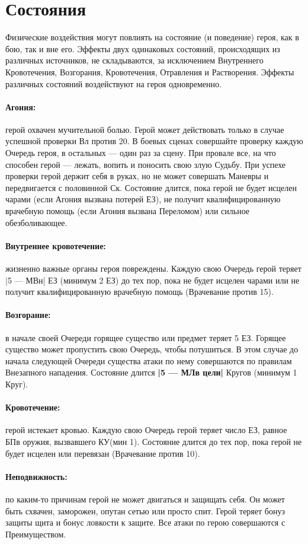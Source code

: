 \section{Состояния}
Физические  воздействия могут повлиять на состояние (и поведение) героя, как в бою, так и вне его. Эффекты двух
одинаковых состояний, происходящих из различных источников, не складываются, за исключением Внутреннего Кровотечения, Возгорания, Кровотечения, Отравления и Растворения. Эффекты различных состояний воздействуют на героя одновременно.
\paragraph{Агония:} герой охвачен мучительной болью. Герой может действовать только в случае успешной проверки Вл против 20. В боевых сценах совершайте проверку каждую Очередь героя, в остальных — один раз за сцену. При провале все, на что способен герой — лежать, вопить и поносить свою злую Судьбу. При успехе проверки герой держит себя в руках, но не может совершать Маневры и передвигается с половинной Ск. Состояние длится, пока герой не будет исцелен чарами (если Агония вызвана потерей ЕЗ), не получит квалифицированную врачебную помощь (если Агония вызвана Переломом) или сильное обезболивающее.
\paragraph{Внутреннее кровотечение:} жизненно важные органы героя повреждены. Каждую свою Очередь герой теряет |5 — МВн| ЕЗ (минимум 2 ЕЗ) до тех пор, пока не будет исцелен чарами или не получит квалифицированную врачебную помощь (Врачевание против 15).
\paragraph{Возгорание:} в начале своей Очереди горящее существо или предмет теряет 5 ЕЗ. Горящее существо может пропустить свою Очередь, чтобы потушиться. В этом случае до начала следующей Очереди существа атаки по нему совершаются по правилам Внезапного нападения. Состояние длится \textbf{|5 — МЛв цели|} Кругов (минимум 1 Круг).
\paragraph{Кровотечение:} герой истекает кровью. Каждую свою Очередь герой теряет число ЕЗ, равное БПв оружия, вызвавшего КУ(мин 1). Состояние длится до тех пор, пока герой не будет исцелен или перевязан (Врачевание против 10).
\paragraph{Неподвижность:} по каким-то причинам герой не может двигаться и защищать себя. Он может быть схвачен, заморожен, опутан сетью или просто спит. Герой теряет бонуз защиты щита и бонус ловкости к защите. Все атаки по герою совершаются с Преимуществом.
